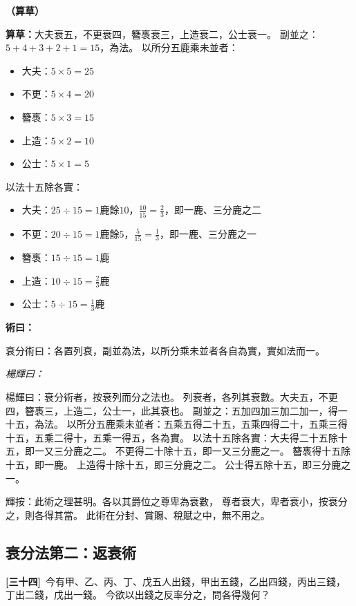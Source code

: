 \documentclass[11pt,a4paper]{article}
\newenvironment{method}{%
  \par\noindent\textcolor{methodcolor}{\textbf{術曰：}}%
  \ignorespaces
}{\par\vspace{0.5em}}
\newenvironment{caocao}{%
  \par\noindent\textcolor{caocaocolor}{\small\textbf{（算草）}}%
  \ignorespaces
}{\par\vspace{0.5em}}
\newenvironment{yanghuicomment}{%
  \par\noindent\textcolor{commentarycolor}{\small\textit{楊輝曰：}}%
  \ignorespaces
}{\par\vspace{0.5em}}
\newcommand{\problemnum}[1]{\textbf{[\ignorespaces#1\unskip]}}
\begin{document}
\begin{caocao}
\textbf{算草：}大夫衰五，不更衰四，簪褭衰三，上造衰二，公士衰一。
副並之：$5 + 4 + 3 + 2 + 1 = 15$，為法。
以所分五鹿乘未並者：
\begin{itemize}[leftmargin=3em]
\item 大夫：$5 \times 5 = 25$
\item 不更：$5 \times 4 = 20$
\item 簪褭：$5 \times 3 = 15$
\item 上造：$5 \times 2 = 10$
\item 公士：$5 \times 1 = 5$
\end{itemize}
以法十五除各實：
\begin{itemize}[leftmargin=3em]
\item 大夫：$25 \div 15 = 1$鹿餘$10$，$\frac{10}{15} = \frac{2}{3}$，即一鹿、三分鹿之二
\item 不更：$20 \div 15 = 1$鹿餘$5$，$\frac{5}{15} = \frac{1}{3}$，即一鹿、三分鹿之一
\item 簪褭：$15 \div 15 = 1$鹿
\item 上造：$10 \div 15 = \frac{2}{3}$鹿
\item 公士：$5 \div 15 = \frac{1}{3}$鹿
\end{itemize}
\end{caocao}

\begin{method}
衰分術曰：各置列衰，副並為法，以所分乘未並者各自為實，實如法而一。
\end{method}

\begin{yanghuicomment}
楊輝曰：衰分術者，按衰列而分之法也。
列衰者，各列其衰數。大夫五，不更四，簪褭三，上造二，公士一，此其衰也。
副並之：五加四加三加二加一，得一十五，為法。
以所分五鹿乘未並者：五乘五得二十五，五乘四得二十，五乘三得十五，五乘二得十，五乘一得五，各為實。
以法十五除各實：大夫得二十五除十五，即一又三分鹿之二。
不更得二十除十五，即一又三分鹿之一。
簪褭得十五除十五，即一鹿。
上造得十除十五，即三分鹿之二。
公士得五除十五，即三分鹿之一。

輝按：此術之理甚明。各以其爵位之尊卑為衰數，
尊者衰大，卑者衰小，按衰分之，則各得其當。
此術在分封、賞賜、稅賦之中，無不用之。
\end{yanghuicomment}

\subsection{衰分法第二：返衰術}

\noindent\problemnum{三十四}\,
今有甲、乙、丙、丁、戊五人出錢，甲出五錢，乙出四錢，丙出三錢，丁出二錢，戊出一錢。
今欲以出錢之反率分之，問各得幾何？
\end{document}
